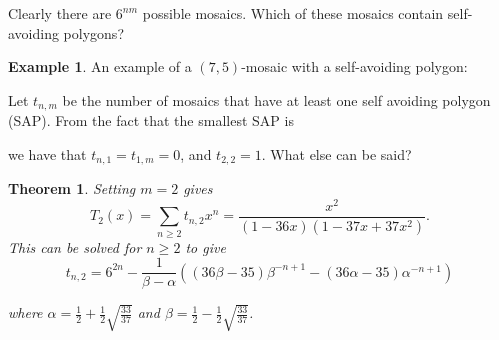 \documentclass[12pt]{article}
\newtheorem{theorem}{Theorem}
\theoremstyle{plain}
\theoremstyle{definition}
\theoremstyle{remark}
\theoremstyle{definition}
\newtheorem{exmp}{Example}[section]
\newcommand{\cellA}[4]{ \draw[thick] ( #1 , #2 ) rectangle ( #3 , #4 ); \draw[red, thick] (#3 * 0.5 + #1 * 0.5 , #2) -- (#3, #4 * 0.5 + #2 * 0.5);}
\newcommand{\cellB}[4]{ \draw[thick] ( #1 , #2 ) rectangle ( #3 , #4 ); \draw[red, thick] (#3 * 0.5 + #1 * 0.5 , #2) -- (#1, #4 * 0.5 + #2 * 0.5);}
\newcommand{\cellC}[4]{ \draw[thick] ( #1 , #2 ) rectangle ( #3 , #4 ); \draw[red, thick] (#3 * 0.5 + #1 * 0.5 , #4) -- (#1, #4 * 0.5 + #2 * 0.5);}
\newcommand{\cellD}[4]{ \draw[thick] ( #1 , #2 ) rectangle ( #3 , #4 ); \draw[red, thick] (#3 * 0.5 + #1 * 0.5 , #4) -- (#3, #4 * 0.5 + #2 * 0.5);}
\newcommand{\cellE}[4]{ \draw[thick] ( #1 , #2 ) rectangle ( #3 , #4 ); \draw[red, thick] (#3 * 0.5 + #1 * 0.5 , #2) -- (#3 * 0.5 + #1 * 0.5 , #4);}
\newcommand{\cellF}[4]{ \draw[thick] ( #1 , #2 ) rectangle ( #3 , #4 ); \draw[red, thick] (#3, #4 * 0.5 + #2 * 0.5) -- (#1, #4 * 0.5 + #2 * 0.5);}
\newcommand{\cellAf}[4]{\filldraw[gray!40] ( #1 , #2 ) rectangle ( #3 , #4 ); \draw[thick] ( #1 , #2 ) rectangle ( #3 , #4 ); \draw[red, thick] (#3 * 0.5 + #1 * 0.5 , #2) -- (#3, #4 * 0.5 + #2 * 0.5);}
\newcommand{\cellBf}[4]{\filldraw[gray!40] ( #1 , #2 ) rectangle ( #3 , #4 ); \draw[thick] ( #1 , #2 ) rectangle ( #3 , #4 ); \draw[red, thick] (#3 * 0.5 + #1 * 0.5 , #2) -- (#1, #4 * 0.5 + #2 * 0.5);}
\newcommand{\cellCf}[4]{\filldraw[gray!40] ( #1 , #2 ) rectangle ( #3 , #4 ); \draw[thick] ( #1 , #2 ) rectangle ( #3 , #4 ); \draw[red, thick] (#3 * 0.5 + #1 * 0.5 , #4) -- (#1, #4 * 0.5 + #2 * 0.5);}
\newcommand{\cellDf}[4]{\filldraw[gray!40] ( #1 , #2 ) rectangle ( #3 , #4 ); \draw[thick] ( #1 , #2 ) rectangle ( #3 , #4 ); \draw[red, thick] (#3 * 0.5 + #1 * 0.5 , #4) -- (#3, #4 * 0.5 + #2 * 0.5);}
\newcommand{\cellEf}[4]{\filldraw[gray!40] ( #1 , #2 ) rectangle ( #3 , #4 ); \draw[thick] ( #1 , #2 ) rectangle ( #3 , #4 ); \draw[red, thick] (#3 * 0.5 + #1 * 0.5 , #2) -- (#3 * 0.5 + #1 * 0.5 , #4);}
\begin{document}
Clearly there are $6^{nm}$ possible mosaics. Which of these mosaics contain self-avoiding polygons?

\begin{exmp}
An example of a $(7,5)$-mosaic with a self-avoiding polygon:
\begin{center}
\end{center}
\end{exmp}

Let $t_{n,m}$ be the number of mosaics that have at least one self avoiding polygon (SAP). From the fact that the smallest SAP is

\begin{center}
\end{center}

we have that $t_{n,1}=t_{1,m}=0$, and $t_{2,2} = 1$. What else can be said?

\begin{theorem}\label{thm: m=2 case}
Setting $m=2$ gives
\begin{equation}
    T_2(x) = \sum_{n \geq 2}t_{n,2}x^n = \frac{x^2}{(1-36x)(1-37x+37x^2)}.
\end{equation}
This can be solved for $n \geq 2$ to give
\begin{equation}
     t_{n,2}= 6^{2n} - \frac{1}{\beta-\alpha}((36\beta-35)\beta^{-n+1} - (36\alpha - 35)\alpha^{-n+1})
\end{equation}

where $\alpha = \frac{1}{2} + \frac{1}{2}\sqrt{\frac{33}{37}}$ and $\beta = \frac{1}{2} - \frac{1}{2}\sqrt{\frac{33}{37}}$.
\end{theorem}
\end{document}
